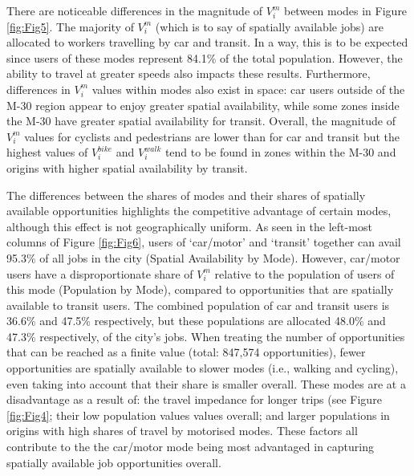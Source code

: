 \documentclass[10pt,letterpaper]{article}
\begin{document}
There are noticeable differences in the magnitude of \(V_i^m\) between
modes in Figure \ref{fig:Fig5}. The majority of \(V_i^m\) (which is to
say of spatially available jobs) are allocated to workers travelling by
car and transit. In a way, this is to be expected since users of these
modes represent 84.1\% of the total population. However, the ability to
travel at greater speeds also impacts these results. Furthermore,
differences in \(V_i^m\) values within modes also exist in space: car
users outside of the M-30 region appear to enjoy greater spatial
availability, while some zones inside the M-30 have greater spatial
availability for transit. Overall, the magnitude of \(V_i^m\) values for
cyclists and pedestrians are lower than for car and transit but the
highest values of \(V_i^{bike}\) and \(V_i^{walk}\) tend to be found in
zones within the M-30 and origins with higher spatial availability by
transit.

The differences between the shares of modes and their shares of
spatially available opportunities highlights the competitive advantage
of certain modes, although this effect is not geographically uniform. As
seen in the left-most columns of Figure \ref{fig:Fig6}, users of
`car/motor' and `transit' together can avail 95.3\% of all jobs in the
city (Spatial Availability by Mode). However, car/motor users have a
disproportionate share of \(V_i^m\) relative to the population of users
of this mode (Population by Mode), compared to opportunities that are
spatially available to transit users. The combined population of car and
transit users is 36.6\% and 47.5\% respectively, but these populations
are allocated 48.0\% and 47.3\% respectively, of the city's jobs. When
treating the number of opportunities that can be reached as a finite
value (total: 847,574 opportunities), fewer opportunities are spatially
available to slower modes (i.e., walking and cycling), even taking into
account that their share is smaller overall. These modes are at a
disadvantage as a result of: the travel impedance for longer trips (see
Figure \ref{fig:Fig4}; their low population values values overall; and
larger populations in origins with high shares of travel by motorised
modes. These factors all contribute to the the car/motor mode being most
advantaged in capturing spatially available job opportunities overall.
\end{document}
